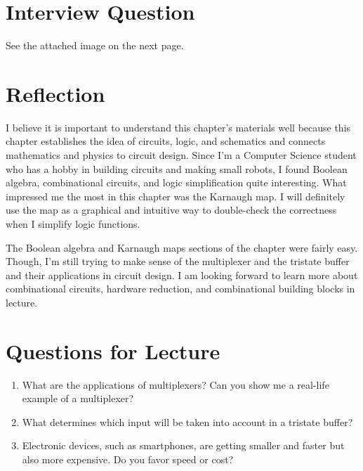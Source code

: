 \documentclass[12pt]{article}
\begin{document}
\section{Interview Question}

See the attached image on the next page.



\section{Reflection}

I believe it is important to understand this chapter's materials well because this chapter establishes the idea of circuits, logic, and schematics and connects mathematics and physics to circuit design. Since I'm a Computer Science student who has a hobby in building circuits and making small robots, I found Boolean algebra, combinational circuits, and logic simplification quite interesting. What impressed me the most in this chapter was the Karnaugh map. I will definitely use the map as a graphical and intuitive way to double-check the correctness when I simplify logic functions.

The Boolean algebra and Karnaugh maps sections of the chapter were fairly easy. Though, I'm still trying to make sense of the multiplexer and the tristate buffer and their applications in circuit design. I am looking forward to learn more about combinational circuits, hardware reduction, and combinational building blocks in lecture.

\section{Questions for Lecture}

\begin{enumerate}
  \item What are the applications of multiplexers? Can you show me a real-life example of a multiplexer?
  \item What determines which input will be taken into account in a tristate buffer?
  \item Electronic devices, such as smartphones, are getting smaller and faster but also more expensive. Do you favor speed or cost?
\end{enumerate}



\end{document}
